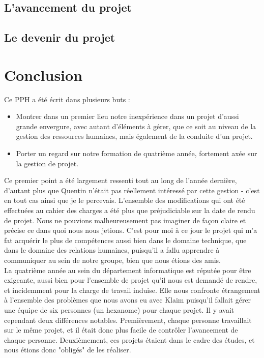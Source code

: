 \documentclass{article}
\begin{document}
	\subsection{L'avancement du projet}
	\subsection{Le devenir du projet}
\section{Conclusion}

		Ce PPH a été écrit dans plusieurs buts : 
		\begin{itemize}
			\item Montrer dans un premier lieu notre inexpérience dans un projet d'aussi grande envergure, avec autant d'éléments à gérer, que ce soit au niveau de la gestion des ressources humaines, mais également de la conduite d'un projet.
			\item Porter un regard sur notre formation de quatrième année, fortement axée sur la gestion de projet. 
		\end{itemize}
		
		Ce premier point a été largement ressenti tout au long de l'année dernière, d'autant plus que Quentin n'était pas réellement intéressé par cette gestion - c'est en tout cas ainsi que je le percevais. L'ensemble des modifications qui ont été effectuées au cahier des charges a été plus que préjudiciable sur la date de rendu de projet. Nous ne pouvions malheureusement pas imaginer de façon claire et précise ce dans quoi nous nous jetions. C'est pour moi à ce jour le projet qui m'a fat acquérir le plus de compétences aussi bien dans le domaine technique, que dans le domaine des relations humaines, puisqu'il a fallu apprendre à communiquer au sein de notre groupe, bien que nous étions des amis. \\
		
		La quatrième année au sein du département informatique est réputée pour être exigeante, aussi bien  pour l'ensemble de projet qu'il nous est demandé de rendre, et incidemment pour la charge de travail induise. Elle nous confronte étrangement à l'ensemble des problèmes que nous avons eu avec Klaim puisqu'il fallait gérer une équipe de six personnes (un hexanome) pour chaque projet. Il y avait cependant deux différences notables. Premièrement, chaque personne travaillait sur le même projet, et il était donc plus facile de contrôler l'avancement de chaque personne. Deuxièmement, ces projets étaient dans le cadre des études, et nous étions donc "obligés" de les réaliser.\\
		
\end{document}
